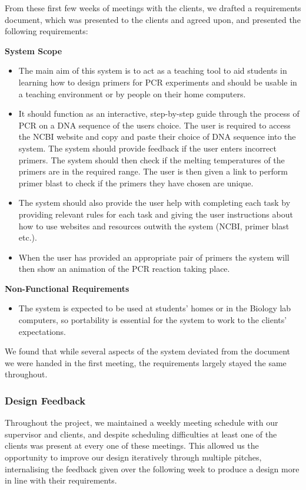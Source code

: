 From these first few weeks of meetings with the clients, we drafted a
requirements document, which was presented to the clients and agreed upon,
and presented the following requirements:

\t\textbf{System Scope}
\begin{itemize}
\item{The main aim of this system is to act as a teaching tool to aid 
students in learning how to design primers for PCR experiments and 
should be usable in a teaching environment or by people on their home 
computers.}
\item{It should function as an interactive, step-by-step guide through 
the process of PCR on a DNA sequence of the users choice. The user is 
required to access the NCBI website and copy and paste their choice
of DNA sequence into the system. The system should provide feedback if 
the user enters incorrect primers. The system should then check if the 
melting temperatures of the primers are in the required range. The user
is then given a link to perform primer blast to check if the primers 
they have chosen are unique.}
\item{The system should also provide the user help with completing each 
task by providing relevant rules for each task and giving the user 
instructions about how to use websites and resources outwith the system 
(NCBI, primer blast etc.).}
\item{When the user has provided an appropriate pair of primers the 
system will then show an animation of the PCR reaction taking place.}
\end{itemize}
\t\textbf{Non-Functional Requirements}
\begin{itemize}
\item{The system is expected to be used at students’ homes or in the 
Biology lab computers, so portability is essential for the system to 
work to the clients’ expectations.}
\end{itemize}
We found that while several aspects of the system deviated from the
document we were handed in the first meeting, the requirements largely
stayed the same throughout.

\subsubsection{Design Feedback}
Throughout the project, we maintained a weekly meeting schedule with our
supervisor and clients, and despite scheduling difficulties at least one
of the clients was present at every one of these meetings. This allowed
us the opportunity to improve our design iteratively through multiple
pitches, internalising the feedback given over the following week to 
produce a design more in line with their requirements.

